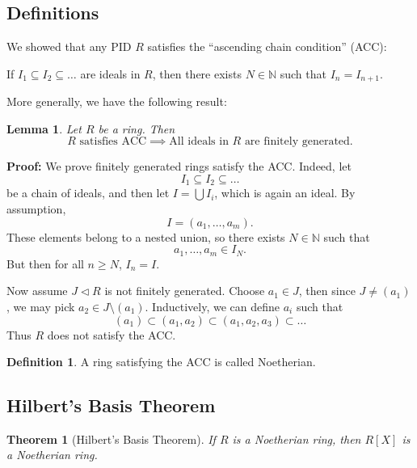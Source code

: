 \documentclass[12pt]{article}
\newtheorem{theorem}{Theorem}[section]
\newtheorem{lemma}{Lemma}[section]
\theoremstyle{definition}
\newtheorem{definition}{Definition}[section]
\theoremstyle{remark}
\begin{document}
\subsection{Definitions}%
\label{sub:definitions_noetherian}

We showed that any PID $R$ satisfies the ``ascending chain condition'' (ACC):

\begin{center}
If $I_1 \subseteq I_2 \subseteq \ldots$ are ideals in $R$, then there exists $N \in \mathbb{N}$ such that $I_n = I_{n + 1}$.
\end{center}

More generally, we have the following result:

\begin{lemma}
	Let $R$ be a ring. Then
	\[
		R \text{ satisfies ACC} \implies \text{All ideals in } R \text{ are finitely generated}
	.\]
\end{lemma}

\begin{adjustbox}{minipage = \columnwidth - 25.5pt, margin=1em, frame=1pt, margin=0em}
	\textbf{Proof:} We prove finitely generated rings satisfy the ACC. Indeed, let
	\[
	I_1 \subseteq I_2 \subseteq \ldots
	\]
	be a chain of ideals, and then let $I = \bigcup I_i$, which is again an ideal. By assumption,
	\[
		I = (a_1, \ldots, a_m)
	.\]
	These elements belong to a nested union, so there exists $N \in \mathbb{N}$ such that
	\[
	a_1, \ldots, a_m \in I_N
	.\]
	But then for all $n \geq N$, $I_n = I$.

	Now assume $J \lhd R$ is not finitely generated. Choose $a_1 \in J$, then since $J \neq (a_1)$, we may pick $a_2 \in J \setminus (a_1)$. Inductively, we can define $a_i$ such that
	\[
		(a_1) \subset (a_1, a_2) \subset (a_1, a_2, a_3) \subset \ldots
	\]
	Thus $R$ does not satisfy the ACC.
\end{adjustbox}

\begin{definition}
	A ring satisfying the ACC is called Noetherian.
\end{definition}

\newpage

\subsection{Hilbert's Basis Theorem}%
\label{sub:hilbert_s_basis_theorem}

\begin{theorem}[Hilbert's Basis Theorem]
	If $R$ is a Noetherian ring, then $R[X]$ is a Noetherian ring.
\end{theorem}
\end{document}
